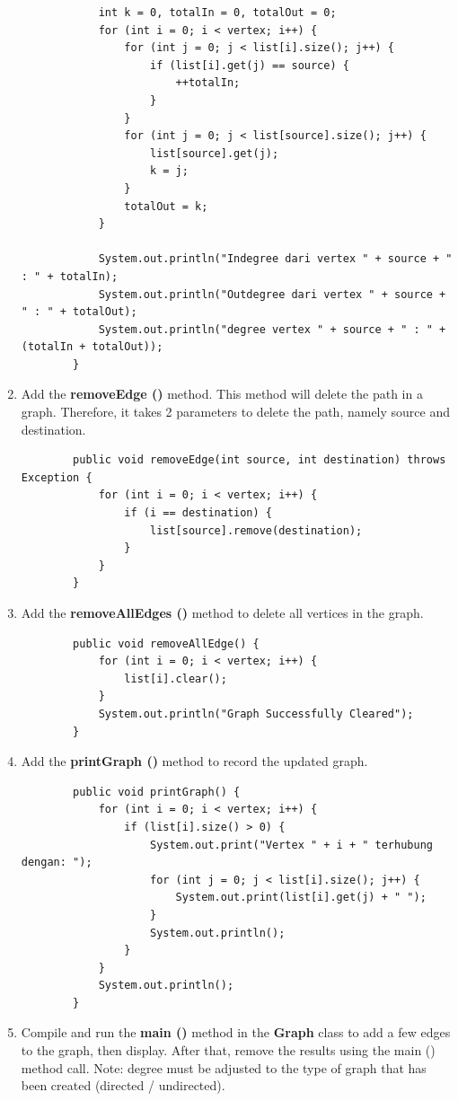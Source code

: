 \documentclass[12pt,titlepage]{article}
\begin{document}
\begin{enumerate}
\begin{verbatim}
            int k = 0, totalIn = 0, totalOut = 0;
            for (int i = 0; i < vertex; i++) {
                for (int j = 0; j < list[i].size(); j++) {
                    if (list[i].get(j) == source) {
                        ++totalIn;
                    }
                }
                for (int j = 0; j < list[source].size(); j++) {
                    list[source].get(j);
                    k = j;
                }
                totalOut = k;
            }

            System.out.println("Indegree dari vertex " + source + " : " + totalIn);
            System.out.println("Outdegree dari vertex " + source + " : " + totalOut);
            System.out.println("degree vertex " + source + " : " + (totalIn + totalOut));
        }
    \end{verbatim}
    \item Add the \textbf{removeEdge ()} method. This method will delete the path in a graph. Therefore, it takes 2 parameters to delete the path, namely source and destination.
    \begin{verbatim}
        public void removeEdge(int source, int destination) throws Exception {
            for (int i = 0; i < vertex; i++) {
                if (i == destination) {
                    list[source].remove(destination);
                }
            }
        }
    \end{verbatim}
    \item Add the \textbf{removeAllEdges ()} method to delete all vertices in the graph.
    \begin{verbatim}
        public void removeAllEdge() {
            for (int i = 0; i < vertex; i++) {
                list[i].clear();
            }
            System.out.println("Graph Successfully Cleared");
        }
    \end{verbatim}
    \item Add the \textbf{printGraph ()} method to record the updated graph.
    \begin{verbatim}
        public void printGraph() {
            for (int i = 0; i < vertex; i++) {
                if (list[i].size() > 0) {
                    System.out.print("Vertex " + i + " terhubung dengan: ");
                    for (int j = 0; j < list[i].size(); j++) {
                        System.out.print(list[i].get(j) + " ");
                    }
                    System.out.println();
                }
            }
            System.out.println();
        }
    \end{verbatim}
    \item Compile and run the \textbf{main ()} method in the \textbf{Graph} class to add a few edges to the graph, then display. After that, remove the results using the main () method call. Note: degree must be adjusted to the type of graph that has been created (directed / undirected).
    \begin{verbatim}
        

\end{verbatim}
\end{enumerate}
\end{document}
